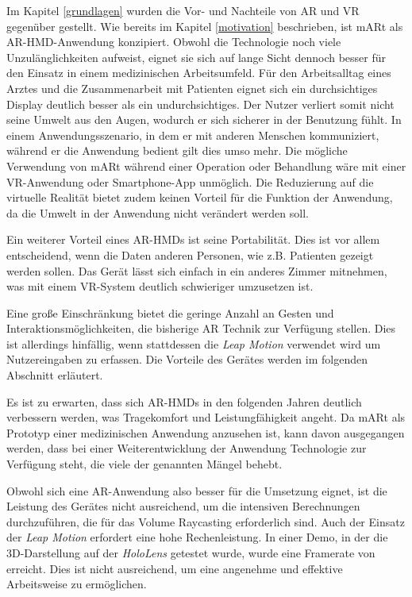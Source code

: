 Im Kapitel \ref{grundlagen} wurden die Vor- und Nachteile von AR und VR gegenüber gestellt.
Wie bereits im Kapitel \ref{motivation} beschrieben, ist mARt als AR-HMD-Anwendung konzipiert. Obwohl die Technologie noch viele Unzulänglichkeiten aufweist, eignet sie sich auf lange Sicht dennoch besser für den Einsatz in einem medizinischen Arbeitsumfeld.
Für den Arbeitsalltag eines Arztes und die Zusammenarbeit mit Patienten eignet sich ein durchsichtiges Display deutlich besser als ein undurchsichtiges. Der Nutzer verliert somit nicht seine Umwelt aus den Augen, wodurch er sich sicherer in der Benutzung fühlt. In einem Anwendungsszenario, in dem er mit anderen Menschen kommuniziert, während er die Anwendung bedient gilt dies umso mehr. Die mögliche Verwendung von mARt während einer Operation oder Behandlung wäre mit einer VR-Anwendung oder Smartphone-App unmöglich. Die Reduzierung auf die virtuelle Realität bietet zudem keinen Vorteil für die Funktion der Anwendung, da die Umwelt in der Anwendung nicht verändert werden soll. 

Ein weiterer Vorteil eines AR-HMDs ist seine Portabilität. Dies ist vor allem entscheidend, wenn die Daten anderen Personen, wie z.B. Patienten gezeigt werden sollen. Das Gerät lässt sich einfach in ein anderes Zimmer mitnehmen, was mit einem VR-System deutlich schwieriger umzusetzen ist.
 
Eine große Einschränkung bietet die geringe Anzahl an Gesten und Interaktionsmöglichkeiten, die bisherige AR Technik zur Verfügung stellen. Dies ist allerdings hinfällig, wenn stattdessen die \textit{Leap Motion} verwendet wird um Nutzereingaben zu erfassen. Die Vorteile des Gerätes werden im folgenden Abschnitt erläutert.

Es ist zu erwarten, dass sich AR-HMDs in den folgenden Jahren deutlich verbessern werden, was Tragekomfort und Leistungfähigkeit angeht. Da mARt als Prototyp einer medizinischen Anwendung anzusehen ist, kann davon ausgegangen werden, dass bei einer Weiterentwicklung der Anwendung Technologie zur Verfügung steht, die viele der genannten Mängel behebt.

Obwohl sich eine AR-Anwendung also besser für die Umsetzung eignet, ist die Leistung des Gerätes nicht ausreichend, um die intensiven Berechnungen durchzuführen, die für das Volume Raycasting erforderlich sind. Auch der Einsatz der \textit{Leap Motion} erfordert eine hohe Rechenleistung.
In einer Demo, in der die 3D-Darstellung auf der \textit{HoloLens} getestet wurde, wurde eine Framerate von 
 erreicht. 
Dies ist nicht ausreichend, um eine angenehme und effektive Arbeitsweise zu ermöglichen. 

